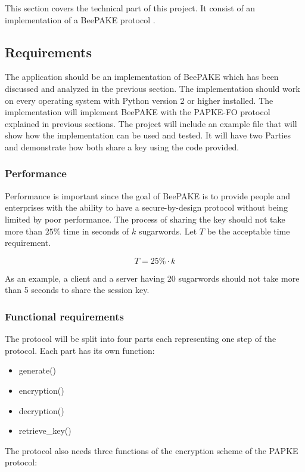 \documentclass[../main.tex]{subfiles}
\begin{document}
This section covers the technical part of this project. It consist of an
implementation of a BeePAKE protocol \cite{marjan2023}. 

\subsection{Requirements}
The application should be an implementation of BeePAKE \cite{marjan2023} which
has been discussed and analyzed in the previous section. The implementation
should work on every operating system with Python version 2 or higher
installed. The implementation will implement BeePAKE with the PAPKE-FO
\cite{bradley2019password} protocol explained in previous sections. The project
will include an example file that will show how the implementation can be used
and tested. It will have two Parties and demonstrate how both share a key using
the code provided.

\subsubsection{Performance}
Performance is important since the goal of BeePAKE is to provide people and 
enterprises with the ability to have a secure-by-design protocol without being
limited by poor performance. The process of sharing the key should not take more 
than \(25\%\) time in seconds of \(k\) sugarwords. Let \(T\) be the acceptable time
requirement. 

\[T = 25\% \cdot k\]

As an example, a client and a server having 20 sugarwords should not take more than
5 seconds to share the session key.

\subsubsection{Functional requirements} 
The protocol will be split into four parts each representing one step of the
protocol. Each part has its own function:

\begin{itemize}
	\item generate()
	\item encryption()
	\item decryption()
	\item retrieve\_key()
\end{itemize}

The protocol also needs three functions of the encryption scheme of the PAPKE protocol:
\end{document}

